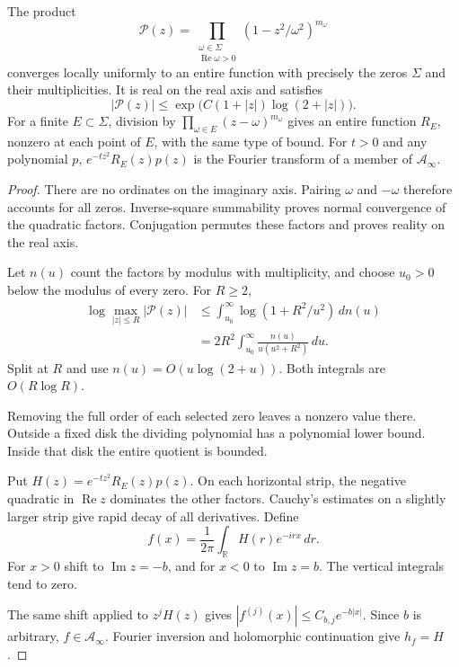 \begin{lemma}
\label{v4-arith:weil:lem:paired-product}
The product
\begin{equation}
 \mathcal P(z)=
  \prod_{\substack{\omega\in\Sigma\\\operatorname{Re}\omega>0}}
             (1-z^2/\omega^2)^{m_\omega}
 \label{v4-arith:weil:eq:paired-product}
\end{equation}
converges locally uniformly to an entire function with precisely the
zeros \(\Sigma\) and their multiplicities. It is real on the real axis
and satisfies
\[
 |\mathcal P(z)|\le
       \exp\bigl(C(1+|z|)\log(2+|z|)\bigr).
\]
For a finite \(E\subset\Sigma\), division by
\(\prod_{\omega\in E}(z-\omega)^{m_\omega}\) gives an entire function
\(R_E\), nonzero at each point of \(E\), with the same type of bound.
For \(t>0\) and any polynomial \(p\),
\(e^{-tz^2}R_E(z)p(z)\) is the Fourier transform of a member of
\(\mathscr A_\infty\).
\end{lemma}
\begin{proof}
There are no ordinates on the imaginary axis. Pairing \(\omega\) and
\(-\omega\) therefore accounts for all zeros. Inverse-square summability
proves normal convergence of the quadratic factors. Conjugation permutes
these factors and proves reality on the real axis.

Let \(n(u)\) count the factors by modulus with multiplicity, and choose
\(u_0>0\) below the modulus of every zero. For \(R\ge2\),
\[
 \begin{aligned}
 \log\max_{|z|\le R}|\mathcal P(z)|
 &\le\int_{u_0}^\infty\log(1+R^2/u^2)\,dn(u)\\
 &=2R^2\int_{u_0}^\infty
                    \frac{n(u)}{u(u^2+R^2)}\,du.
 \end{aligned}
\]
Split at \(R\) and use \(n(u)=O(u\log(2+u))\).
Both integrals are \(O(R\log R)\).

Removing the full order of each selected zero leaves a nonzero value
there. Outside a fixed disk the dividing polynomial has a polynomial
lower bound. Inside that disk the entire quotient is bounded.

Put \(H(z)=e^{-tz^2}R_E(z)p(z)\). On each horizontal strip, the negative
quadratic in \(\operatorname{Re}z\) dominates the other factors.
Cauchy's estimates on a slightly larger strip give rapid decay of
all derivatives. Define
\[
 f(x)=\frac1{2\pi}\int_{\mathbb R}H(r)e^{-irx}\,dr.
\]
For \(x>0\) shift to \(\operatorname{Im}z=-b\), and for \(x<0\)
to \(\operatorname{Im}z=b\). The vertical integrals tend to zero.

The same shift applied to \(z^jH(z)\) gives
\(|f^{(j)}(x)|\le C_{b,j}e^{-b|x|}\).
Since \(b\) is arbitrary, \(f\in\mathscr A_\infty\).
Fourier inversion and holomorphic continuation give \(h_f=H\).
\end{proof}

